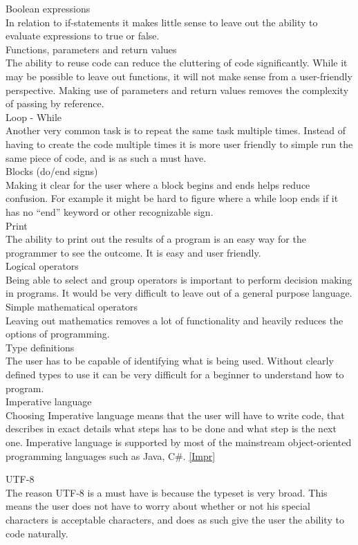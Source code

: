 Boolean expressions \\
In relation to if-statements it makes little sense to leave out the ability to evaluate expressions to true or false. \\

Functions, parameters and return values \\
The ability to reuse code can reduce the cluttering of code significantly. While it may be possible to leave out functions, it will not make sense from a user-friendly perspective. Making use of parameters and return values removes the complexity of passing by reference. \\

Loop - While \\
Another very common task is to repeat the same task multiple times. Instead of having to create the code multiple times it is more user friendly to simple run the same piece of code, and is as such a must have. \\

Blocks (do/end signs) \\
Making it clear for the user where a block begins and ends helps reduce confusion. For example it might be hard to figure where a while loop ends if it has no ``end'' keyword or other recognizable sign. \\

Print \\
The ability to print out the results of a program is an easy way for the programmer to see the outcome. It is easy and user friendly. \\

Logical operators \\
Being able to select and group operators is important to perform decision making in programs. It would be very difficult to leave out of a general purpose language.\\

Simple mathematical operators \\
Leaving out mathematics removes a lot of functionality and heavily reduces the options of programming. \\

Type definitions \\
The user has to be capable of identifying what is being used. Without clearly defined types to use it can be very difficult for a beginner to understand how to program. \\

Imperative language \\
Choosing Imperative language means that the user will have to write code, that describes in exact details what steps has to be done and what step is the next one. Imperative language is supported by most of the mainstream object-oriented programming languages such as Java, C\#. \ref{Impr}

UTF-8 \\
The reason UTF-8 is a must have is because the typeset is very broad. This means the user does not have to worry about whether or not his special characters is acceptable characters, and does as such give the user the ability to code naturally.